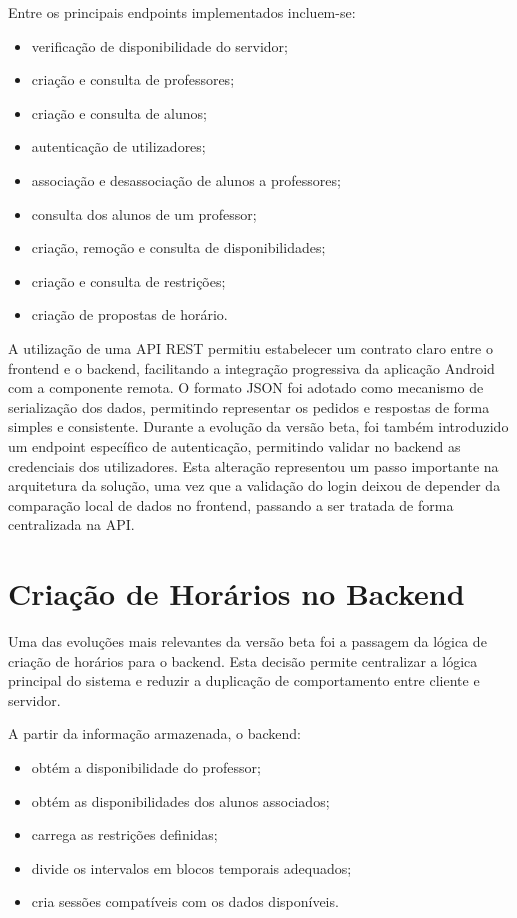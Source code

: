 Entre os principais endpoints implementados incluem-se:
\begin{itemize}
    \item verificação de disponibilidade do servidor;
    \item criação e consulta de professores;
    \item criação e consulta de alunos;
    \item autenticação de utilizadores;
    \item associação e desassociação de alunos a professores;
    \item consulta dos alunos de um professor;
    \item criação, remoção e consulta de disponibilidades;
    \item criação e consulta de restrições;
    \item criação de propostas de horário.
\end{itemize}


A utilização de uma API REST permitiu estabelecer um contrato claro entre o frontend e o backend, facilitando a integração progressiva da aplicação Android com a componente remota.
O formato JSON foi adotado como mecanismo de serialização dos dados, permitindo representar os pedidos e respostas de forma simples e consistente.
Durante a evolução da versão beta, foi também introduzido um endpoint específico de autenticação, permitindo validar no backend as credenciais dos utilizadores.
Esta alteração representou um passo importante na arquitetura da solução, uma vez que a validação do login deixou de depender da comparação local de dados no frontend,
passando a ser tratada de forma centralizada na API.

\section{Criação de Horários no Backend}

Uma das evoluções mais relevantes da versão beta foi a passagem da lógica de criação de horários para o backend.
Esta decisão permite centralizar a lógica principal do sistema e reduzir a duplicação de comportamento entre cliente e servidor.

A partir da informação armazenada, o backend:
\begin{itemize}
    \item obtém a disponibilidade do professor;
    \item obtém as disponibilidades dos alunos associados;
    \item carrega as restrições definidas;
    \item divide os intervalos em blocos temporais adequados;
    \item  cria sessões compatíveis com os dados disponíveis.
\end{itemize}

